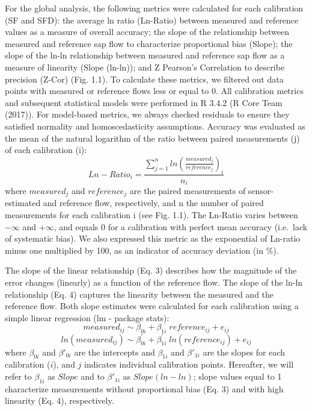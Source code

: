 \documentclass[11pt,twoside]{reedthesis}
\begin{document}
For the global analysis, the following metrics were calculated for each
calibration (SF and SFD): the average ln ratio (Ln-Ratio) between
measured and reference values as a measure of overall accuracy; the
slope of the relationship between measured and reference sap flow to
characterize proportional bias (Slope); the slope of the ln-ln
relationship between measured and reference sap flow as a measure of
linearity (Slope (ln-ln)); and Z Pearson's Correlation to describe
precision (Z-Cor) (Fig. 1.1). To calculate these metrics, we filtered
out data points with measured or reference flows less or equal to 0. All
calibration metrics and subsequent statistical models were performed in
R 3.4.2 (R Core Team (2017)). For model-based metrics, we always checked
residuals to ensure they satisfied normality and homoscedasticity
assumptions. Accuracy was evaluated as the mean of the natural logarithm
of the ratio between paired measurements (j) of each calibration (i):
\begin{equation}
Ln-Ratio_i = \frac{\sum_{j=1}^{n} ln(\frac{measured_j}{reference_j})_i}{n_i}
\end{equation}
where \(measured_j\) and \(reference_j\) are the paired measurements of
sensor-estimated and reference flow, respectively, and n the number of
paired measurements for each calibration i (see Fig. 1.1). The Ln-Ratio
varies between \(-\infty\) and \(+\infty\), and equals 0 for a
calibration with perfect mean accuracy (i.e.~lack of systematic bias).
We also expressed this metric as the exponential of Ln-ratio minus one
multiplied by 100, as an indicator of accuracy deviation (in \%).\par

The slope of the linear relationship (Eq. 3) describes how the magnitude
of the error changes (linearly) as a function of the reference flow. The
slope of the ln-ln relationship (Eq. 4) captures the linearity between
the measured and the reference flow. Both slope estimates were
calculated for each calibration using a simple linear regression (lm -
package stats):
\begin{equation}
measured_{ij} \sim \beta_{0i}+\beta_{1i}\;reference_{ij}+e_{ij}
\end{equation}
\begin{equation}
ln(measured_{ij}) \sim \beta^{\prime}_{0i}+\beta^{\prime}_{1i}\;ln(reference_{ij}) +e_{ij}
\end{equation}
where \(\beta_{0i}\) and \(\beta'_{0i}\) are the intercepts and
\(\beta_{1i}\) and \(\beta'_{1i}\) are the slopes for each calibration
(\(i\)), and \(j\) indicates individual calibration points. Hereafter,
we will refer to \(\beta_{1i}\) as \(Slope\) and to \(\beta'_{1i}\) as
\(Slope (ln-ln)\); slope values equal to 1 characterize measurements
without proportional bias (Eq. 3) and with high linearity (Eq. 4),
respectively.\par
\end{document}
